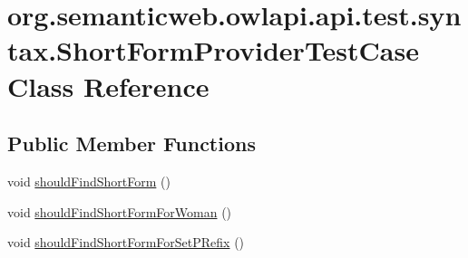\hypertarget{classorg_1_1semanticweb_1_1owlapi_1_1api_1_1test_1_1syntax_1_1_short_form_provider_test_case}{\section{org.\-semanticweb.\-owlapi.\-api.\-test.\-syntax.\-Short\-Form\-Provider\-Test\-Case Class Reference}
\label{classorg_1_1semanticweb_1_1owlapi_1_1api_1_1test_1_1syntax_1_1_short_form_provider_test_case}
}
\subsection*{Public Member Functions}
\begin{DoxyCompactItemize}
\item 
void \hyperlink{classorg_1_1semanticweb_1_1owlapi_1_1api_1_1test_1_1syntax_1_1_short_form_provider_test_case_a43c03feba22f3c79198b0c035db7eea5}{should\-Find\-Short\-Form} ()
\item 
void \hyperlink{classorg_1_1semanticweb_1_1owlapi_1_1api_1_1test_1_1syntax_1_1_short_form_provider_test_case_aac1ca9f1bee8201b79923ff374cf1839}{should\-Find\-Short\-Form\-For\-Woman} ()
\item 
void \hyperlink{classorg_1_1semanticweb_1_1owlapi_1_1api_1_1test_1_1syntax_1_1_short_form_provider_test_case_a09fbde8b3b957efc4ccdcb8da8c643cd}{should\-Find\-Short\-Form\-For\-Set\-P\-Refix} ()
\end{DoxyCompactItemize}


